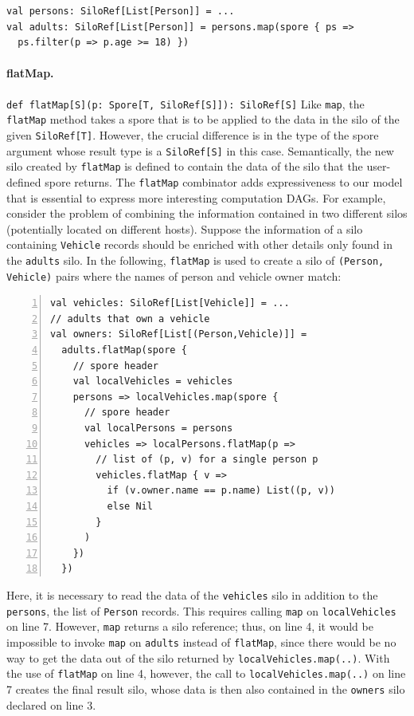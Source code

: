 \documentclass{jfp1}
\begin{document}
\begin{lstlisting}
val persons: SiloRef[List[Person]] = ...
val adults: SiloRef[List[Person]] = persons.map(spore { ps =>
  ps.filter(p => p.age >= 18) })
\end{lstlisting}


\paragraph{flatMap.}%
%
\texttt{def flatMap[S](p: Spore[T, SiloRef[S]]): SiloRef[S]} \newline
%
Like \verb|map|, the \verb|flatMap| method takes a spore that is to be applied
to the data in the silo of the given \verb|SiloRef[T]|. However, the crucial
difference is in the type of the spore argument whose result type is a
\verb|SiloRef[S]| in this case. Semantically, the new silo created by
\verb|flatMap| is defined to contain the data of the silo that the user-defined
spore returns. The \verb|flatMap| combinator adds expressiveness to our model
that is essential to express more interesting computation DAGs. For example,
consider the problem of combining the information contained in two different
silos (potentially located on different hosts). Suppose the information of a
silo containing \verb|Vehicle| records should be enriched with other details
only found in the \verb|adults| silo. In the following, \verb|flatMap| is used
to create a silo of \verb|(Person, Vehicle)| pairs where the names of person and
vehicle owner match:

\begin{lstlisting}[numbers=left,xleftmargin=2em,framexleftmargin=1.5em]
val vehicles: SiloRef[List[Vehicle]] = ...
// adults that own a vehicle
val owners: SiloRef[List[(Person,Vehicle)]] = 
  adults.flatMap(spore {
    // spore header
    val localVehicles = vehicles 
    persons => localVehicles.map(spore {
      // spore header
      val localPersons = persons 
      vehicles => localPersons.flatMap(p =>
        // list of (p, v) for a single person p
        vehicles.flatMap { v => 
          if (v.owner.name == p.name) List((p, v))
          else Nil
        }
      )
    })
  })
\end{lstlisting}
\noindent
Here, it is necessary to read the data of the \verb|vehicles| silo in
addition to the \verb|persons|, the list of \verb|Person|
records. This requires calling \verb|map| on \verb|localVehicles| on
line 7.  However, \verb|map| returns a silo reference; thus, on line
4, it would be impossible to invoke \verb|map| on \verb|adults|
instead of \verb|flatMap|, since there would be no way to get the data
out of the silo returned by \verb|localVehicles.map(..)|. With the use
of \verb|flatMap| on line 4, however, the call to
\verb|localVehicles.map(..)| on line 7 creates the final result silo,
whose data is then also contained in the \verb|owners| silo declared
on line 3.
\end{document}
